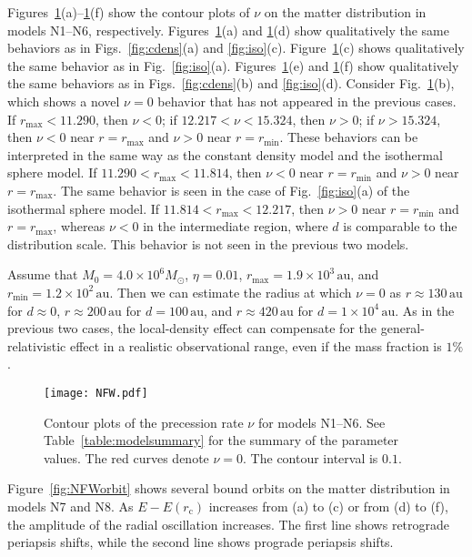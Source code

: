\documentclass[aps,11pt,nofootinbib,preprintnumbers,groupedaddress,superscriptaddress]{revtex4-2}
\begin{document}
Figures~\ref{fig:NFWcontour}(a)--\ref{fig:NFWcontour}(f) show the contour plots of $\nu$ on the matter distribution in models N1--N6, respectively.  
Figures~\ref{fig:NFWcontour}(a) and \ref{fig:NFWcontour}(d) show qualitatively the same behaviors as in Figs.~\ref{fig:cdens}(a) and \ref{fig:iso}(c). 
Figure~\ref{fig:NFWcontour}(c) shows qualitatively the same behavior as in Fig.~\ref{fig:iso}(a).
Figures~\ref{fig:NFWcontour}(e) and \ref{fig:NFWcontour}(f) show qualitatively the same behaviors as in Figs.~\ref{fig:cdens}(b) and \ref{fig:iso}(d). 
Consider Fig.~\ref{fig:NFWcontour}(b), which shows a novel $\nu=0$ behavior that has not appeared in the previous cases. 
If $r_{\mathrm{max}}<11.290$, then $\nu<0$; 
if $12.217<\nu<15.324$, then $\nu>0$; 
if $\nu>15.324$, then $\nu<0$ near $r=r_{\mathrm{max}}$ and $\nu>0$ near $r=r_{\mathrm{min}}$. 
These behaviors can be interpreted 
in the same way as the constant density model and the isothermal sphere model.
If $11.290<r_{\mathrm{max}}<11.814$, then $\nu<0$ near $r=r_{\mathrm{min}}$ and $\nu>0$ near $r=r_{\mathrm{max}}$. 
The same behavior is seen in the case of Fig.~\ref{fig:iso}(a) of 
the isothermal sphere model.
If $11.814<r_{\mathrm{max}}<12.217$, 
then $\nu>0$ near $r=r_{\mathrm{min}}$ and $r=r_{\mathrm{max}}$, 
whereas $\nu<0$ in the intermediate region, where $d$ is comparable to the distribution scale. 
This behavior is not seen in the previous two models.


Assume that $M_0=4.0\times 10^{6} M_{\odot}$, 
$\eta=0.01$,
$r_{\mathrm{max}}=1.9\times 10^{3} \,\mathrm{au}$,
and 
$r_{\mathrm{min}}=1.2\times 10^2 \,\mathrm{au}$. 
Then we can estimate the radius at which $\nu=0$ as 
$r\approx 130 \,\mathrm{au}$ for $d\approx 0$, 
$r\approx 200 \,\mathrm{au}$ for $d=100 \,\mathrm{au}$, 
and
$r\approx 420 \,\mathrm{au}$ for $d=1\times 10^4 \,\mathrm{au}$. 
As in the previous two cases, the 
local-density
effect can compensate for the 
general-relativistic effect in a realistic observational range, even if the mass fraction is $1\%$.



\begin{figure}[t]
\centering
\texttt{[image: NFW.pdf]}
\caption{Contour plots of 
the precession rate $\nu$ for models N1--N6. 
See Table~\ref{table:modelsummary} for the summary of the parameter values.
The red curves denote $\nu=0$. The contour interval is $0.1$.
}
\label{fig:NFWcontour}
\end{figure}

Figure~\ref{fig:NFWorbit} shows 
several bound
orbits on the matter distribution in models N7 and N8. 
As $E-E(r_{\mathrm{c}})$ increases from (a) to (c) or from (d) to (f), 
the amplitude of the radial oscillation increases.
The first line shows retrograde 
periapsis shifts, while 
the second line shows prograde 
periapsis shifts. 
\end{document}
